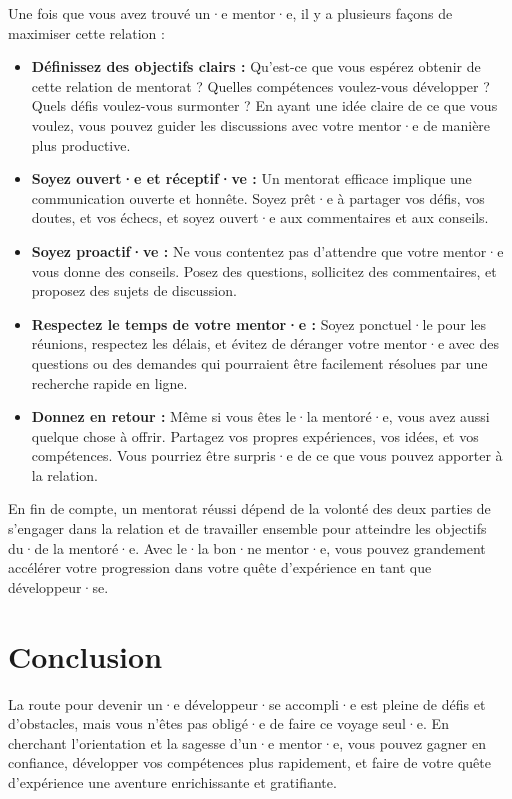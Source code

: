 Une fois que vous avez trouvé un·e mentor·e, il y a plusieurs façons de maximiser cette relation :

\begin{itemize}
  \item \textbf{Définissez des objectifs clairs :} Qu'est-ce que vous espérez obtenir de cette relation de mentorat ? Quelles compétences voulez-vous développer ? Quels défis voulez-vous surmonter ? En ayant une idée claire de ce que vous voulez, vous pouvez guider les discussions avec votre mentor·e de manière plus productive.
  \item \textbf{Soyez ouvert·e et réceptif·ve :} Un mentorat efficace implique une communication ouverte et honnête. Soyez prêt·e à partager vos défis, vos doutes, et vos échecs, et soyez ouvert·e aux commentaires et aux conseils.
  \item \textbf{Soyez proactif·ve :} Ne vous contentez pas d'attendre que votre mentor·e vous donne des conseils. Posez des questions, sollicitez des commentaires, et proposez des sujets de discussion.
  \item \textbf{Respectez le temps de votre mentor·e :} Soyez ponctuel·le pour les réunions, respectez les délais, et évitez de déranger votre mentor·e avec des questions ou des demandes qui pourraient être facilement résolues par une recherche rapide en ligne.
  \item \textbf{Donnez en retour :} Même si vous êtes le·la mentoré·e, vous avez aussi quelque chose à offrir. Partagez vos propres expériences, vos idées, et vos compétences. Vous pourriez être surpris·e de ce que vous pouvez apporter à la relation.
\end{itemize}

En fin de compte, un mentorat réussi dépend de la volonté des deux parties de s'engager dans la relation et de travailler ensemble pour atteindre les objectifs du·de la mentoré·e. Avec le·la bon·ne mentor·e, vous pouvez grandement accélérer votre progression dans votre quête d'expérience en tant que développeur·se.

\section{Conclusion}

La route pour devenir un·e développeur·se accompli·e est pleine de défis et d'obstacles, mais vous n'êtes pas obligé·e de faire ce voyage seul·e. En cherchant l'orientation et la sagesse d'un·e mentor·e, vous pouvez gagner en confiance, développer vos compétences plus rapidement, et faire de votre quête d'expérience une aventure enrichissante et gratifiante.

